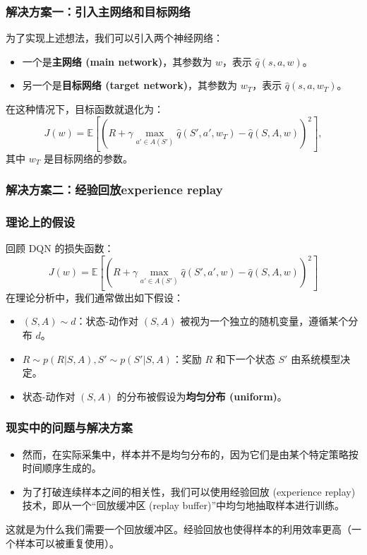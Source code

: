 \documentclass{article}
\begin{document}
\subsubsection*{解决方案一：引入主网络和目标网络}

为了实现上述想法，我们可以引入两个神经网络：
\begin{itemize}
    \item 一个是\textbf{主网络 (main network)}，其参数为 $w$，表示 $\hat{q}(s, a, w)$。
    \item 另一个是\textbf{目标网络 (target network)}，其参数为 $w_T$，表示 $\hat{q}(s, a, w_T)$。
\end{itemize}

在这种情况下，目标函数就退化为：
\[
J(w) = \mathbb{E} \left[ \left( R + \gamma \max_{a' \in A(S')} \hat{q}(S', a', w_T) - \hat{q}(S, A, w) \right)^2 \right],
\]
其中 $w_T$ 是目标网络的参数。
\subsubsection*{解决方案二：经验回放experience replay}
\subsubsection*{理论上的假设}

回顾 DQN 的损失函数：
\[
J(w) = \mathbb{E} \left[ \left( R + \gamma \max_{a' \in A(S')} \hat{q}(S', a', w) - \hat{q}(S, A, w) \right)^2 \right]
\]
在理论分析中，我们通常做出如下假设：
\begin{itemize}
    \item $(S, A) \sim d$：状态-动作对 $(S, A)$ 被视为一个独立的随机变量，遵循某个分布 $d$。
    \item $R \sim p(R|S, A), S' \sim p(S'|S, A)$：奖励 $R$ 和下一个状态 $S'$ 由系统模型决定。
    \item 状态-动作对 $(S, A)$ 的分布被假设为\textbf{均匀分布 (uniform)}。
\end{itemize}

\subsubsection*{现实中的问题与解决方案}

\begin{itemize}
    \item 然而，在实际采集中，样本并不是均匀分布的，因为它们是由某个特定策略按时间顺序生成的。
    \item 为了打破连续样本之间的相关性，我们可以使用经验回放 (experience replay) 技术，即从一个“回放缓冲区 (replay buffer)”中均匀地抽取样本进行训练。
\end{itemize}

这就是为什么我们需要一个回放缓冲区。经验回放也使得样本的利用效率更高（一个样本可以被重复使用）。
\end{document}

